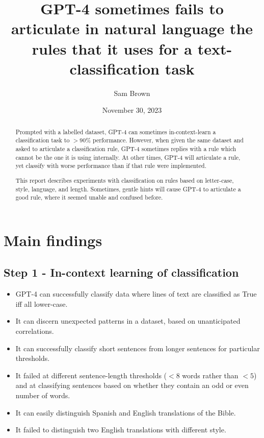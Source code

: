 \documentclass[a4paper, 11pt]{article}
\title{GPT-4 sometimes fails to articulate in natural language the rules that it uses for a text-classification task}
\author{Sam Brown}
\date{November 30, 2023}  %
\begin{document}
\maketitle


\begin{abstract}
Prompted with a labelled dataset, GPT-4 can sometimes in-context-learn a classification task to $>90\%$ performance.
However, when given the same dataset and asked to articulate a classification rule, GPT-4 sometimes replies with a rule which cannot be the one it is using internally.
At other times, GPT-4 will articulate a rule, yet classify with worse performance than if that rule were implemented.

This report describes experiments with classification on rules based on letter-case, style, language, and length. Sometimes, gentle hints will cause GPT-4 to articulate a good rule, where it seemed unable and confused before.
\end{abstract}


\section{Main findings}

\subsection{Step 1 - In-context learning of classification}


\begin{itemize}

\item GPT-4 can successfully classify data where lines of text are classified as True iff all lower-case.
\item It can discern unexpected patterns in a dataset, based on unanticipated correlations.
\item It can successfully classify short sentences from longer sentences for particular thresholds.
\item It failed at different sentence-length thresholds ($<8$ words rather than $<5$) and at classifying sentences based on whether they contain an odd or even number of words.
\item It can easily distinguish Spanish and English translations of the Bible.
\item It failed to distinguish two English translations with different style.

\end{itemize}
\end{document}
